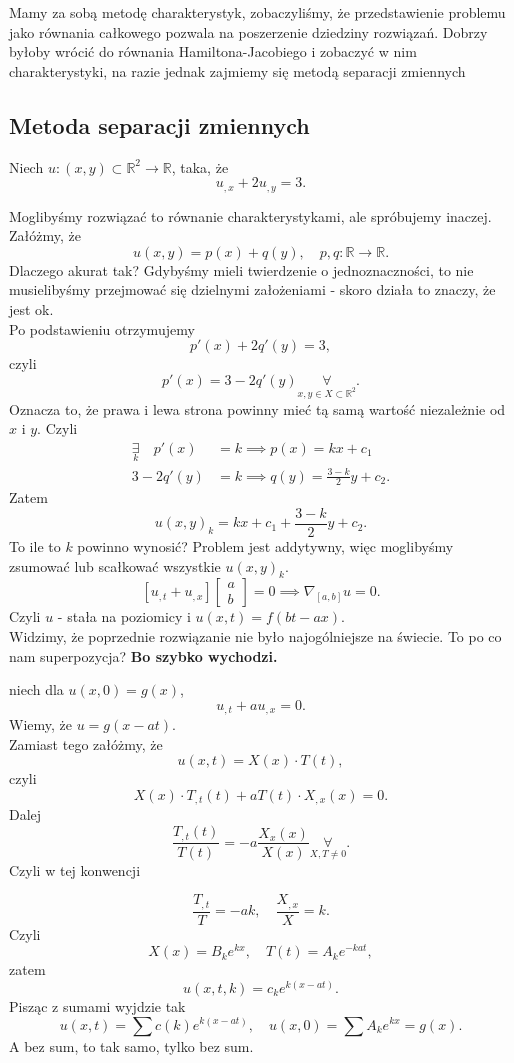 \documentclass[../main.tex]{subfiles}
\begin{document}
		Mamy za sobą metodę charakterystyk, zobaczyliśmy, że przedstawienie problemu jako równania całkowego pozwala na poszerzenie dziedziny rozwiązań. Dobrzy byłoby wrócić do równania Hamiltona-Jacobiego i zobaczyć w nim charakterystyki, na razie jednak zajmiemy się metodą separacji zmiennych
		\subsection{Metoda separacji zmiennych}
		\begin{przyklad}
				Niech $u: (x,y)\subset\mathbb{R}^2\to \mathbb{R}$, taka, że
				\[
						u_{,x} + 2u_{,y} = 3
				.\]
		\end{przyklad}
		Moglibyśmy rozwiązać to równanie charakterystykami, ale spróbujemy inaczej. Załóżmy, że
		\[
				u(x,y) = p(x) + q(y),\quad p,q:\mathbb{R}\to \mathbb{R}
		.\]
		Dlaczego akurat tak? Gdybyśmy mieli twierdzenie o jednoznaczności, to nie musielibyśmy przejmować się dzielnymi założeniami - skoro działa to znaczy, że jest ok.\\
		Po podstawieniu otrzymujemy
		\[
				p'(x) + 2q'(y) = 3
		,\]
		czyli
		\[
				p'(x) = 3-2q'(y) \underset{x,y\in X\subset\mathbb{R}^2}{\forall}
		.\]
		Oznacza to, że prawa i lewa strona powinny mieć tą samą wartość niezależnie od $x$ i $y$. Czyli
		\begin{align*}
				\underset{k}{\exists}\quad p'(x) &= k \implies p(x) = kx + c_1\\
						3-2q'(y) &= k \implies q(y) = \frac{3-k}{2} y + c_2
		.\end{align*}
		Zatem
		\[
				u(x,y)_k = kx + c_1 + \frac{3-k}{2} y + c_2
		.\]
		To ile to $k$ powinno wynosić? Problem jest addytywny, więc moglibyśmy zsumować lub scałkować wszystkie $u(x,y)_k$.
		\[
				\left[ u_{,t}+u_{,x} \right] \begin{bmatrix} a\\b \end{bmatrix} = 0 \implies \nabla_{[a,b]}u = 0
		.\]
		Czyli $u$ - stała na poziomicy i $u(x,t) = f(bt-ax)$.\\
		Widzimy, że poprzednie rozwiązanie nie było najogólniejsze na świecie. To po co nam superpozycja? \textbf{Bo szybko wychodzi.}
		 \begin{przyklad}
				 niech dla $u(x,0) = g(x)$,
				 \[
				 u_{,t} + au_{,x} = 0
				 .\]
				 Wiemy, że $u = g(x-at)$.\\
				 Zamiast tego załóżmy, że
				  \[
						  u(x,t) = X(x) \cdot T(t)
				 ,\]
				 czyli
				 \[
						 X(x) \cdot T_{,t}(t) + aT(t) \cdot X_{,x}(x) = 0
				 .\]
				 Dalej
				 \[
						 \frac{T_{,t}(t)}{T(t)} = -a \frac{X_{x}(x)}{X(x)} \underset{X,T \neq 0}{\forall}
				 .\]
				 Czyli w tej konwencji

				 \[
						 \frac{T_{,t}}{T} = -a k,\quad \frac{X_{,x}}{X} = k
				 .\]
				 Czyli
				 \[
						 X(x) = B_k e^{kx},\quad T(t) = A_ke^{-kat}
				 ,\]
				 zatem
				 \[
						 u(x,t,k) = c_k e^{k\left( x-at \right) }
				 .\]
				 Pisząc z sumami wyjdzie tak
				 \[
						 u(x,t) = \sum c(k) e^{k(x-at)},\quad u(x,0) = \sum A_k e^{kx} = g(x)
				 .\]
				 A bez sum, to tak samo, tylko bez sum.
		\end{przyklad}
\end{document}

